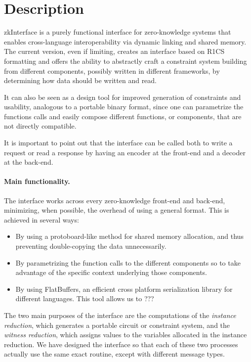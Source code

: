 \section{Description}
		
		zkInterface is a purely functional interface for zero-knowledge systems that enables cross-language interoperability via dynamic linking and shared memory. The current version, even if limiting, creates an interface based on R1CS formatting and offers the ability to abstractly craft a constraint system building from different components, possibly written in different frameworks, by determining how data should be written and read. 
		
		It can also be seen as a design tool for improved generation of constraints and usability, analogous to a portable binary format, since one can parametrize the functions calls and easily compose different functions, or components, that are not directly compatible.
		
		It is important to point out that the interface can be called both to write a request or read a response by having an encoder at the front-end  and a decoder at the back-end. 
		
		\paragraph{Main functionality.}
		
		The interface works across every zero-knowledge front-end and back-end, minimizing, when possible, the overhead of using a general format. This is achieved in several ways:
        
        \begin{itemize}
			\item By using a protoboard-like method for shared memory allocation, and thus preventing double-copying the data unnecessarily.
			\item By parametrizing the function calls to the different components so to take advantage of the specific context underlying those components.
			\item By using FlatBuffers, an efficient cross platform serialization library for different languages. This tool allows us to ???
        \end{itemize}
        
        The two main purposes of the interface are the computations of the \emph{instance reduction}, which generates a portable circuit or constraint system, and the \emph{witness reduction}, which assigns values to the variables allocated in the instance reduction. We have designed the interface so that each of these two processes actually use the same exact routine, except with different message types.

